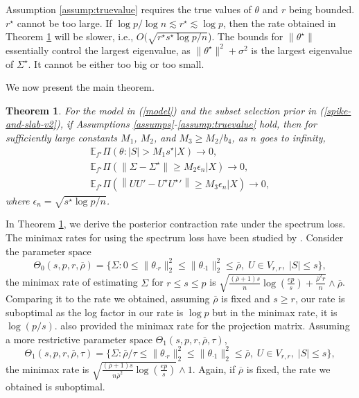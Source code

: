 \documentclass[pdftex, noinfoline, letter]{imsart}
\theoremstyle{plain}
\newtheorem{theorem}{Theorem}[section]
\begin{document}
Assumption \ref{assump:truevalue} requires the true values of $\theta$ and $r$ being bounded. $r^\star$ cannot be too large. If $\log p/\log n \lesssim r^\star \lesssim \log p$, then the rate obtained in Theorem \ref{Thm: Post-cont-rate} will be slower, i.e., $O(\sqrt{r^\star s^\star \log p/n}$). The bounds for $\|\theta^\star\|$ essentially control the largest eigenvalue, as $\|\theta^\star\|^2 + \sigma^2$ is the largest eigenvalue of $\Sigma^\star$. It cannot be either too big or too small. 

We now present the main theorem.
\begin{theorem}
\label{Thm: Post-cont-rate}
For the model in (\ref{model}) and the subset selection prior in (\ref{spike-and-slab-v2}), if Assumptions \ref{assumps}-\ref{assump:truevalue} hold, then for sufficiently large constants $M_1$, $M_2$, and $M_3 \geq M_2/b_4$, as $n$ goes to infinity,
\begin{eqnarray}
    & \mathbb{E}_{f^\star} \Pi(\theta: |S| > M_1 s^\star| X) \to 0, 
	\label{Thm-1:eqn-3}& \\
	& \mathbb{E}_{f^\star} \Pi(\|\Sigma - \Sigma^\star\| \geq M_2\epsilon_n| X) \to 0,
	\label{Thm-1:eqn-1}& \\
	&\mathbb{E}_{f^\star}  
	\Pi \left(\left\|UU' - U^\star {U^\star}'\right\| \geq M_3\epsilon_n| X \right) \to 0,
	\label{Thm-1:eqn-2}&
\end{eqnarray}
where $\epsilon_n = \sqrt{s^\star \log p/n}$.
\end{theorem}

In Theorem \ref{Thm: Post-cont-rate}, we derive the posterior contraction rate under the spectrum loss.
The minimax rates for using the spectrum loss have been studied by \citet{cai15}.
Consider the parameter space 
$$
\Theta_0(s, p, r, \overline\rho) = \Big\{
\Sigma: 0 \leq \|\theta_{\cdot r}\|_2^2 \leq \|\theta_{\cdot 1}\|_2^2 \leq \overline\rho,\; U \in V_{r, r},\; |S| \leq s 
\Big\},
$$
the minimax rate of estimating $\Sigma$ for $r \leq s \leq p$ is 
$
\sqrt{\frac{(\overline\rho + 1)s}{n} \log \left( \frac{ep}{s} \right) + \frac{\overline\rho^2 r}{n}} \wedge \overline\rho
$.
Comparing it to the rate we obtained, assuming $\overline\rho$ is fixed and $s \geq r$, our rate is suboptimal as the log factor in our rate is $\log p$ but in the minimax rate, it is $\log (p/s)$. \citet{cai15} also provided the minimax rate for the projection matrix. Assuming a more restrictive parameter space $\Theta_1(s, p, r, \overline{\rho}, \tau)$,
$$
\Theta_1(s, p, r, \overline\rho, \tau) = \Big\{
\Sigma: \overline\rho/\tau \leq \|\theta_{\cdot r}\|_2^2 \leq \|\theta_{\cdot 1}\|_2^2 \leq \overline\rho,\; U \in V_{r, r},\; |S| \leq s
\Big\},
$$
the minimax rate is $\sqrt{\frac{(\overline\rho + 1)s}{n\overline\rho^2} \log \left(\frac{ep}{s}\right)} \wedge 1$. Again, if $\overline\rho$ is fixed, the rate we obtained is suboptimal.
\end{document}

